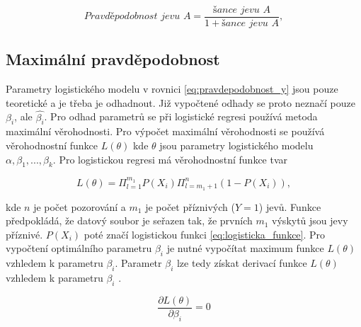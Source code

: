 \begin{equation}
    \textit{Pravděpodobnost jevu A} = \frac{\textit{šance jevu A}}{1 + \textit{šance jevu A}},
\end{equation}

\subsection{Maximální pravděpodobnost}
Parametry logistického modelu v rovnici \ref{eq:pravdepodobnost_y} jsou pouze teoretické a je třeba je odhadnout. Již vypočtené odhady
se proto neznačí pouze $\beta_i$, ale $\hat{\beta_i}$. Pro odhad parametrů se při logistické regresi používá metoda maximální věrohodnosti. Pro výpočet
maximální věrohodnosti se používá věrohodnostní funkce $L(\theta)$ kde $\theta$ jsou parametry logistického modelu $\alpha, \beta_1, ..., \beta_k$.
Pro logistickou regresi má věrohodnostní funkce tvar

\begin{equation}
    \label{eq:pravdepodobnostni_fce}
    L(\theta) = \Pi_{l = 1}^{m_1} P(X_i) \Pi_{l = m_1 + 1}^{n} (1 - P(X_i)),
\end{equation}

kde $n$ je počet pozorování a $m_1$ je počet příznivých ($Y = 1$) jevů. Funkce předpokládá, že datový soubor je seřazen tak, že prvních $m_1$ výskytů
jsou jevy příznivé. $P(X_i)$ poté značí logistickou funkci \ref{eq:logisticka_funkce}. Pro vypočtení optimálního parametru $\beta_i$ je nutné vypočítat
maximum funkce $L(\theta)$ vzhledem k parametru $\beta_i$. Parametr $\beta_i$ lze tedy získat derivací funkce $L(\theta)$ vzhledem k parametru $\beta_i$
\cite{kleinbaum_logistic_2010}.

\begin{equation}
    \frac{\partial L(\theta)}{\partial \beta_i} = 0
\end{equation}

